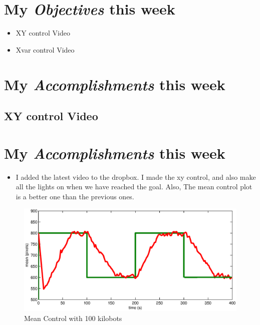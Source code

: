 \newcommand{\handoutName}{Weekly report}
\newcommand{\handoutdate}{\today}


\section{My \emph{Objectives} this week}
\begin{itemize}
\item XY control Video
\item Xvar control Video
\end{itemize}
\section{My \emph{Accomplishments} this week}

\subsection{XY control Video}

\section{My \emph{Accomplishments} this week}
\begin{itemize}
\item I added the latest video to the dropbox. I made the xy control, and also make all the lights on when we have reached the goal. Also, The mean control plot is a better one than the previous ones.
\end{itemize}
\begin{figure}
        \centering
         \includegraphics[width=\textwidth]{fig/meancontrol.eps}
                \caption{Mean Control with 100 kilobots }
                \label{fig:meancontrol}
        
\end{figure}




